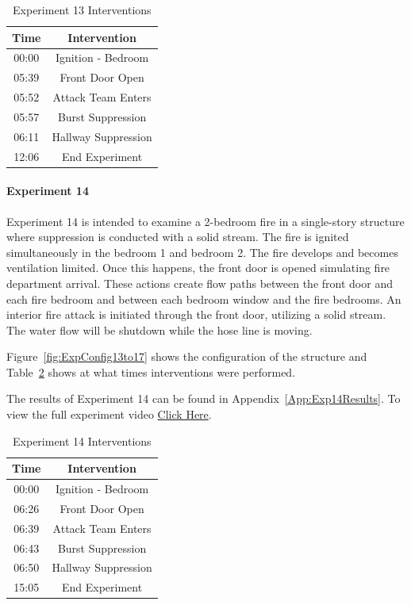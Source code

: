 \documentclass[12pt,oneside]{book}
\begin{document}
\begin{table}[H]
	\centering
	\caption{Experiment 13 Interventions}
	\begin{tabular}{|c|c|} 
		\hline
		Time & Intervention \\ \hline \hline
		00:00 & Ignition - Bedroom \\ \hline
		05:39 & Front Door Open \\ \hline
		05:52 & Attack Team Enters\\ \hline
		05:57 & Burst Suppression \\ \hline 
		06:11 & Hallway Suppression \\ \hline
		12:06 & End Experiment\\ \hline
	\end{tabular}
	\label{Table:Exp13Interventions}
\end{table}

\clearpage

\paragraph{Experiment 14} \mbox{}

Experiment 14 is intended to examine a 2-bedroom fire in a single-story structure where suppression is conducted with a solid stream. The fire is ignited simultaneously in the bedroom 1 and bedroom 2. The fire develops and becomes ventilation limited. Once this happens, the front door is opened simulating fire department arrival. These actions create flow paths between the front door and each fire bedroom and between each bedroom window and the fire bedrooms. An interior fire attack is initiated through the front door, utilizing a solid stream. The water flow will be shutdown while the hose line is moving. 

Figure~\ref{fig:ExpConfig13to17} shows the configuration of the structure and Table~\ref{Table:Exp14Interventions} shows at what times interventions were performed. 

The results of Experiment 14 can be found in Appendix~\ref{App:Exp14Results}. To view the full experiment video \href{https://youtu.be/gl8rc1Nsl1k}{Click Here}.

\begin{table}[H]
	\centering
	\caption{Experiment 14 Interventions}
	\begin{tabular}{|c|c|} 
		\hline
		Time & Intervention \\ \hline \hline
		00:00 & Ignition - Bedroom \\ \hline
		06:26 & Front Door Open \\ \hline
		06:39 & Attack Team Enters\\ \hline
		06:43 & Burst Suppression \\ \hline 
		06:50 & Hallway Suppression \\ \hline
		15:05 & End Experiment\\ \hline
	\end{tabular}
	\label{Table:Exp14Interventions}
\end{table}
\end{document}
